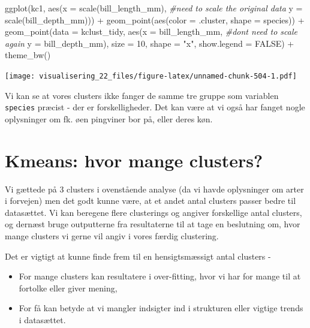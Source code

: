 \documentclass[
]{book}
\newenvironment{Shaded}{\begin{snugshade}}{\end{snugshade}}
\newcommand{\AttributeTok}[1]{\textcolor[rgb]{0.77,0.63,0.00}{#1}}
\newcommand{\CommentTok}[1]{\textcolor[rgb]{0.56,0.35,0.01}{\textit{#1}}}
\newcommand{\ConstantTok}[1]{\textcolor[rgb]{0.00,0.00,0.00}{#1}}
\newcommand{\DecValTok}[1]{\textcolor[rgb]{0.00,0.00,0.81}{#1}}
\newcommand{\FunctionTok}[1]{\textcolor[rgb]{0.00,0.00,0.00}{#1}}
\newcommand{\NormalTok}[1]{#1}
\newcommand{\SpecialCharTok}[1]{\textcolor[rgb]{0.00,0.00,0.00}{#1}}
\newcommand{\StringTok}[1]{\textcolor[rgb]{0.31,0.60,0.02}{#1}}
\providecommand{\tightlist}{%
  \setlength{\itemsep}{0pt}\setlength{\parskip}{0pt}}
\begin{document}
\begin{Shaded}
\begin{Highlighting}[]
\FunctionTok{ggplot}\NormalTok{(kc1, }\FunctionTok{aes}\NormalTok{(}\AttributeTok{x =} \FunctionTok{scale}\NormalTok{(bill\_length\_mm), }\CommentTok{\#need to scale the original data}
                \AttributeTok{y =} \FunctionTok{scale}\NormalTok{(bill\_depth\_mm))) }\SpecialCharTok{+} 
  \FunctionTok{geom\_point}\NormalTok{(}\FunctionTok{aes}\NormalTok{(}\AttributeTok{color =}\NormalTok{ .cluster, }\AttributeTok{shape =}\NormalTok{ species)) }\SpecialCharTok{+}
  \FunctionTok{geom\_point}\NormalTok{(}\AttributeTok{data =}\NormalTok{ kclust\_tidy, }
             \FunctionTok{aes}\NormalTok{(}\AttributeTok{x =}\NormalTok{ bill\_length\_mm, }\CommentTok{\#don\textquotesingle{}t need to scale again}
                 \AttributeTok{y =}\NormalTok{ bill\_depth\_mm),}
             \AttributeTok{size =} \DecValTok{10}\NormalTok{, }\AttributeTok{shape =} \StringTok{"x"}\NormalTok{, }\AttributeTok{show.legend =} \ConstantTok{FALSE}\NormalTok{) }\SpecialCharTok{+} 
  \FunctionTok{theme\_bw}\NormalTok{()}
\end{Highlighting}
\end{Shaded}

\texttt{[image: visualisering\_22\_files/figure-latex/unnamed-chunk-504-1.pdf]}

Vi kan se at vores clusters ikke fanger de samme tre gruppe som variablen \texttt{species} præcist - der er forskelligheder. Det kan være at vi også har fanget nogle oplysninger om fk. øen pingviner bor på, eller deres køn.

\hypertarget{kmeans-hvor-mange-clusters}{%
\section{Kmeans: hvor mange clusters?}\label{kmeans-hvor-mange-clusters}}

Vi gættede på 3 clusters i ovenstående analyse (da vi havde oplysninger om arter i forvejen) men det godt kunne være, at et andet antal clusters passer bedre til datasættet. Vi kan beregene flere clusterings og angiver forskellige antal clusters, og dernæst bruge outputterne fra resultaterne til at tage en beslutning om, hvor mange clusters vi gerne vil angiv i vores færdig clustering.

Det er vigtigt at kunne finde frem til en hensigtsmæssigt antal clusters -

\begin{itemize}
\tightlist
\item
  For mange clusters kan resultatere i over-fitting, hvor vi har for mange til at fortolke eller giver mening,
\item
  For få kan betyde at vi mangler indsigter ind i strukturen eller vigtige trends i datasættet.
\end{itemize}
\end{document}
